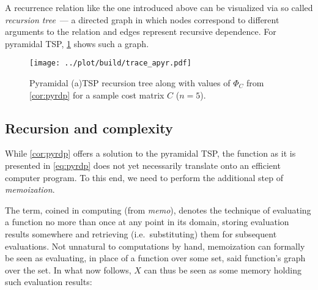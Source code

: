 \documentclass[titlepage,twoside,index=totoc,bibliography=totoc]{scrartcl}
\newcommand{\annotation}[1]{\marginpar{\small\itshape\color{green}#1}}
\numberwithin{equation}{section}
\numberwithin{figure}{section}
\numberwithin{table}{section}
\let\defstyle\itshape
\begin{document}
A recurrence relation like the one introduced above can be visualized
via so called {\defstyle recursion tree}~--- a directed graph in which
nodes correspond to different arguments to the relation and edges
represent recursive dependence.  For pyramidal TSP, \cref{fig:pyratrace}
shows such a graph.

\begin{figure}[htbp]
  \centering
  \texttt{[image: ../plot/build/trace\_apyr.pdf]}
\caption{Pyramidal (a)TSP recursion tree along with values of $\Phi_C$
  from \cref{cor:pyrdp} for a sample cost matrix $C$ ($n=5$).}
\label{fig:pyratrace}
\end{figure}


\subsection{Recursion and complexity}

While \cref{cor:pyrdp} offers a solution to the pyramidal TSP, the
function as it is presented in \cref{eq:pyrdp}
does not yet necessarily translate onto an efficient computer program.
To this end, we need to perform the additional step of {\defstyle memoization}.

The term, coined in computing (from {\defstyle memo}), denotes the
technique of evaluating a function no more than once at any point in its domain,
storing evaluation results somewhere and retrieving (i.e.\ substituting) them for
subsequent evaluations.
Not unnatural to computations by hand, memoization can formally be seen as
evaluating, in place of a function over some set, said function's graph over
the set.
In what now follows, $X$ can thus be seen as some memory holding such evaluation results:
\end{document}
